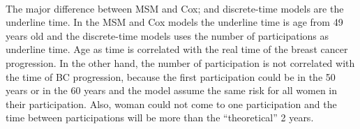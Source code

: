 \paragraph{}The major difference between MSM and Cox; and discrete-time models are the underline
time. In the MSM and Cox models the underline time is age from 49 years old and the discrete-time
models uses the number of participations as underline time. Age as time is correlated with the real
time of the breast cancer progression. In the other hand, the number of participation is not
correlated with the time of BC progression, because the first participation could be in the 50
years or in the 60 years and the model assume the same risk for all women in their participation.
Also, woman could not come to one participation and the time between participations will be more
than the ``theoretical'' 2 years.




